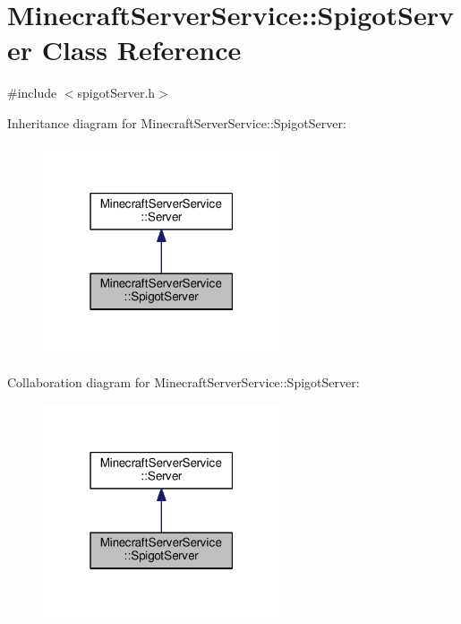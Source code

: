 \hypertarget{class_minecraft_server_service_1_1_spigot_server}{}\section{Minecraft\+Server\+Service\+:\+:Spigot\+Server Class Reference}
\label{class_minecraft_server_service_1_1_spigot_server}


{\ttfamily \#include $<$spigot\+Server.\+h$>$}



Inheritance diagram for Minecraft\+Server\+Service\+:\+:Spigot\+Server\+:\nopagebreak
\begin{figure}[H]
\begin{center}
\leavevmode
\includegraphics[width=199pt]{class_minecraft_server_service_1_1_spigot_server__inherit__graph}
\end{center}
\end{figure}


Collaboration diagram for Minecraft\+Server\+Service\+:\+:Spigot\+Server\+:\nopagebreak
\begin{figure}[H]
\begin{center}
\leavevmode
\includegraphics[width=199pt]{class_minecraft_server_service_1_1_spigot_server__coll__graph}
\end{center}
\end{figure}
